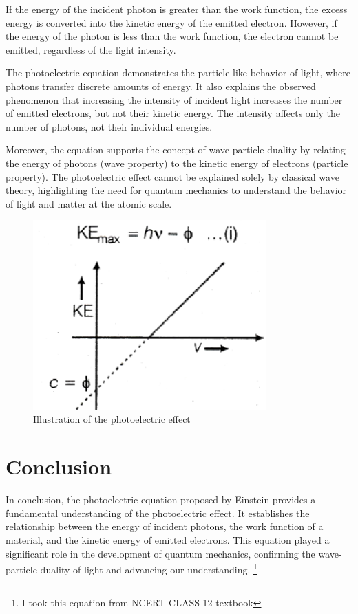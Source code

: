 \documentclass[a4paper, 11pt]{article}
\begin{document}
If the energy of the incident photon is greater than the work function, the excess energy is converted into the kinetic energy of the emitted electron. However, if the energy of the photon is less than the work function, the electron cannot be emitted, regardless of the light intensity. 

The photoelectric equation demonstrates the particle-like behavior of light, where photons transfer discrete amounts of energy. It also explains the observed phenomenon that increasing the intensity of incident light increases the number of emitted electrons, but not their kinetic energy. The intensity affects only the number of photons, not their individual energies.

Moreover, the equation supports the concept of wave-particle duality by relating the energy of photons (wave property) to the kinetic energy of electrons (particle property). The photoelectric effect cannot be explained solely by classical wave theory, highlighting the need for quantum mechanics to understand the behavior of light and matter at the atomic scale.
\begin{figure}[h]
    \centering
    \includegraphics[width=0.8\textwidth]{IMG PHOTOELECTRIC.png}
    \caption{Illustration of the photoelectric effect}
    \label{fig:photoelectric}
\end{figure}


\section{Conclusion}

In conclusion, the photoelectric equation proposed by Einstein provides a fundamental understanding of the photoelectric effect. It establishes the relationship between the energy of incident photons, the work function of a material, and the kinetic energy of emitted electrons. This equation played a significant role in the development of quantum mechanics, confirming the wave-particle duality of light and advancing our understanding.
\footnote{I took this equation from NCERT CLASS 12 textbook}
\end{document}
